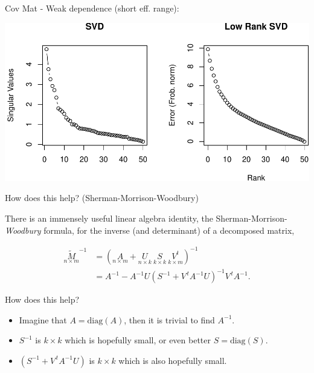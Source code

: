 \documentclass[11pt,ignorenonframetext,]{beamer}
\begin{document}
\begin{frame}{Cov Mat - Weak dependence (short eff. range):}
\protect\hypertarget{cov-mat---weak-dependence-short-eff.-range}{}

\begin{center}\includegraphics[width=\textwidth]{Lec21_files/figure-beamer/unnamed-chunk-10-1} \end{center}

\end{frame}

\begin{frame}[t]{How does this help? (Sherman-Morrison-Woodbury)}
\protect\hypertarget{how-does-this-help-sherman-morrison-woodbury}{}

There is an immensely useful linear algebra identity, the
Sherman-Morrison-\emph{Woodbury} formula, for the inverse (and
determinant) of a decomposed matrix,

\[\begin{aligned}
\underset{n \times m}{\tilde M}^{-1} 
&= \left(\underset{n \times m}{A} + \underset{n \times k}{U} ~ \underset{k \times k}{S} ~ \underset{k \times m}{V^t}\right)^{-1} \\
&= A^{-1} - A^{-1} U \left(S^{-1}+V^{\,t} A^{-1} U\right)^{-1}V^{\,t} A^{-1}.
\end{aligned}\]

\pause

How does this help?

\begin{itemize}
\item
  Imagine that \(A = \text{diag}(A)\), then it is trivial to find
  \(A^{-1}\).
\item
  \(S^{-1}\) is \(k \times k\) which is hopefully small, or even better
  \(S = \text{diag}(S)\).
\item
  \(\left(S^{-1}+V^{\,t} A^{-1} U\right)\) is \(k \times k\) which is
  also hopefully small.
\end{itemize}

\end{frame}
\end{document}
